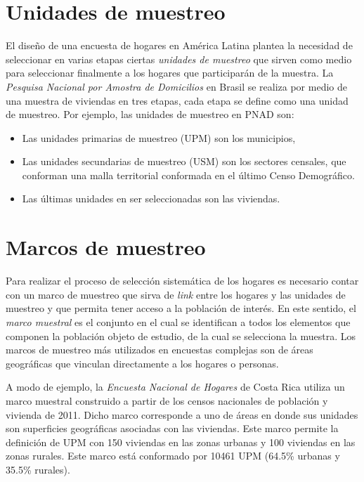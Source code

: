 \documentclass[
  spanish,
  12pt,
]{book}
\providecommand{\tightlist}{%
  \setlength{\itemsep}{0pt}\setlength{\parskip}{0pt}}
\begin{document}
\section{Unidades de muestreo}\label{unidades-de-muestreo}

El diseño de una encuesta de hogares en América Latina plantea la necesidad de seleccionar en varias etapas ciertas \emph{unidades de muestreo} que sirven como medio para seleccionar finalmente a los hogares que participarán de la muestra. La \emph{Pesquisa Nacional por Amostra de Domicilios} en Brasil se realiza por medio de una muestra de viviendas en tres etapas, cada etapa se define como una unidad de muestreo. Por ejemplo, las unidades de muestreo en PNAD son:

\begin{itemize}
\tightlist
\item
  Las unidades primarias de muestreo (UPM) son los municipios,
\item
  Las unidades secundarias de muestreo (USM) son los sectores censales, que conforman una malla territorial conformada en el último Censo Demográfico.
\item
  Las últimas unidades en ser seleccionadas son las viviendas.
\end{itemize}

\section{Marcos de muestreo}\label{marcos-de-muestreo}

Para realizar el proceso de selección sistemática de los hogares es necesario contar con un marco de muestreo que sirva de \emph{link} entre los hogares y las unidades de muestreo y que permita tener acceso a la población de interés. En este sentido, el \emph{marco muestral} es el conjunto en el cual se identifican a todos los elementos que componen la población objeto de estudio, de la cual se selecciona la muestra. Los marcos de muestreo más utilizados en encuestas complejas son de áreas geográficas que vinculan directamente a los hogares o personas.

A modo de ejemplo, la \emph{Encuesta Nacional de Hogares} de Costa Rica utiliza un marco muestral construido a partir de los censos nacionales de población y vivienda de 2011. Dicho marco corresponde a uno de áreas en donde sus unidades son superficies geográficas asociadas con las viviendas. Este marco permite la definición de UPM con 150 viviendas en las zonas urbanas y 100 viviendas en las zonas rurales. Este marco está conformado por 10461 UPM (64.5\% urbanas y 35.5\% rurales).
\end{document}
